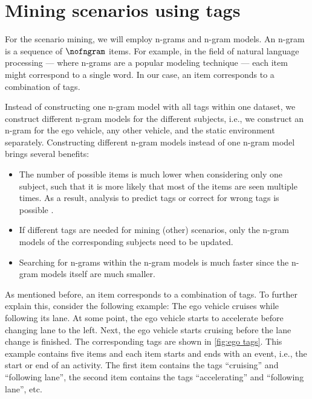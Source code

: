 \section{Mining scenarios using tags}
\label{sec:mining}

\begin{figure*}
	\centering
	
	\caption{\cstartb Example of tags of the ego vehicle and the associated items.\cendb}
	\label{fig:ego tags}
\end{figure*}

\cstartb
For the scenario mining, we will employ n-grams and n-gram models. An n-gram is a sequence of $\nofngram$ items. 
For example, in the field of natural language processing --- where n-grams are a popular modeling technique \autocite{hull1982experiments, brown1992class} --- each item might correspond to a single word. 
In our case, an item corresponds to a combination of tags. 

Instead of constructing one n-gram model with all tags within one dataset, we construct different n-gram models for the different subjects, i.e., we construct an n-gram for the ego vehicle, any other vehicle, and the static environment separately.
Constructing different n-gram models instead of one n-gram model brings several benefits:
\begin{itemize}
	\item The number of possible items is much lower when considering only one subject, such that it is more likely that most of the items are seen multiple times. 
	As a result, analysis to predict tags or correct for wrong tags is possible \autocite{lesher1998optimal}.
	\item If different tags are needed for mining (other) scenarios, only the n-gram models of the corresponding subjects need to be updated.
	\item Searching for n-grams within the n-gram models is much faster since the n-gram models itself are much smaller.
\end{itemize}

As mentioned before, an item corresponds to a combination of tags. 
To further explain this, consider the following example: The ego vehicle cruises while following its lane. 
At some point, the ego vehicle starts to accelerate before changing lane to the left. 
Next, the ego vehicle starts cruising before the lane change is finished. 
The corresponding tags are shown in \cref{fig:ego tags}.
This example contains five items and each item starts and ends with an event, i.e., the start or end of an activity.
The first item contains the tags ``cruising'' and ``following lane'', the second item contains the tags ``accelerating'' and ``following lane'', etc.


